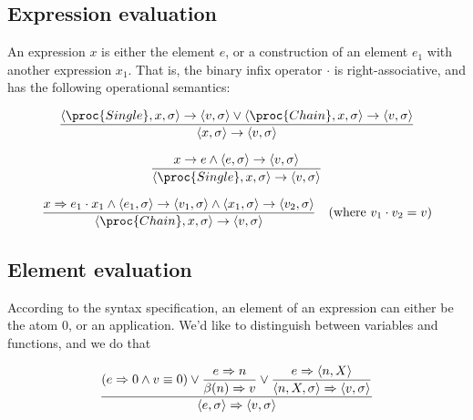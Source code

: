 \subsection{Expression evaluation}

An expression $x$ is either the element $e$, or a construction of an element
$e_1$ with another expression $x_1$. That is, the binary infix operator $\cdot$
is right-associative, and has the following operational semantics:

\everymath{\displaystyle}

\begin{equation}
{\displaystyle
  \left\langle \proc{Single}, x,\sigma\right\rangle
  \rightarrow
  \left\langle v,\sigma\right\rangle
\vee
  \left\langle \proc{Chain}, x,\sigma\right\rangle
  \rightarrow
  \left\langle v,\sigma\right\rangle
\over\displaystyle
  \left\langle x,\sigma\right\rangle
  \rightarrow
  \left\langle v,\sigma\right\rangle
}
\end{equation}

\begin{equation}
{\displaystyle
  x\rightarrow e
\wedge
  \left\langle e,\sigma\right\rangle
  \rightarrow
  \left\langle v,\sigma\right\rangle
\over\displaystyle
  \left\langle \proc{Single}, x,\sigma\right\rangle
  \rightarrow
  \left\langle v,\sigma\right\rangle
}
\end{equation}

\begin{equation}
{\displaystyle
  x\Rightarrow e_1\cdot x_1
\wedge
  \left\langle e_1,\sigma\right\rangle
  \rightarrow
  \left\langle v_1,\sigma\right\rangle
\wedge
  \left\langle x_1,\sigma\right\rangle
  \rightarrow
  \left\langle v_2,\sigma\right\rangle
\over\displaystyle
  \left\langle \proc{Chain}, x, \sigma\right\rangle
  \rightarrow
  \left\langle v, \sigma\right\rangle
}
\quad(\text{where }v_1\cdot v_2=v)
\end{equation}

\subsection{Element evaluation}

According to the syntax specification, an element of an expression can either
be the atom $0$, or an application. We'd like to distinguish between variables
and functions, and we do that  

\begin{equation}
{\displaystyle
\left(
    e\Rightarrow 0
  \wedge
    v\equiv 0
\right)
\vee
{\displaystyle
    e\Rightarrow n
\over\displaystyle
    \beta(n)\Rightarrow v
}
\vee
{\displaystyle
    e\Rightarrow \left\langle n, X\right\rangle
\over\displaystyle
    \left\langle n,X,\sigma\right\rangle
    \Rightarrow
    \left\langle v,\sigma\right\rangle
}
\over\displaystyle
\left\langle e,\sigma\right\rangle
\Rightarrow
\left\langle v,\sigma\right\rangle
}
\end{equation}

